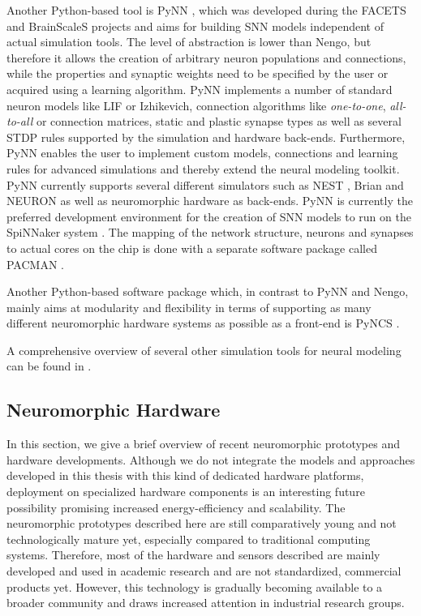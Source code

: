 Another Python-based tool is \ac{PyNN} \parencite{Davies2010}, which was developed during the \ac{FACETS}  and \ac{BrainScaleS}  projects and aims for building \ac{SNN} models independent of actual simulation tools.
The level of abstraction is lower than \ac{Nengo}, but therefore it allows the creation of arbitrary neuron populations and connections, while the properties and synaptic weights need to be specified by the user or acquired using a learning algorithm.
\ac{PyNN} implements a number of standard neuron models like \ac{LIF} or Izhikevich, connection algorithms like \emph{one-to-one}, \emph{all-to-all} or connection matrices, static and plastic synapse types as well as several \ac{STDP} rules supported by the simulation and hardware back-ends.
Furthermore, \ac{PyNN} enables the user to implement custom models, connections and learning rules for advanced simulations and thereby extend the neural modeling toolkit.
\ac{PyNN} currently supports several different simulators such as \ac{NEST} \parencite{Gewaltig2007}, Brian \parencite{Goodman2009} and NEURON  \parencite{Carnevale2009} as well as neuromorphic hardware as back-ends.
\ac{PyNN} is currently the preferred development environment for the creation of \ac{SNN} models to run on the \ac{SpiNNaker} system \parencite{Furber2014}.
The mapping of the network structure, neurons and synapses to actual cores on the chip is done with a separate software package called \ac{PACMAN} \parencite{Galluppi2012}.

Another Python-based software package which, in contrast to \ac{PyNN} and \ac{Nengo}, mainly aims at modularity and flexibility in terms of supporting as many different neuromorphic hardware systems as possible as a front-end is \ac{PyNCS} \parencite{Stefanini2014}.

A comprehensive overview of several other simulation tools for neural modeling can be found in \textcite{Brette2007}.

\subsection{Neuromorphic Hardware}
\label{sec:neuromorphic_HW}

In this section, we give a brief overview of recent neuromorphic prototypes and hardware developments.
Although we do not integrate the models and approaches developed in this thesis with this kind of dedicated hardware platforms, deployment on specialized hardware components is an interesting future possibility promising increased energy-efficiency and scalability.
The neuromorphic prototypes described here are still comparatively young and not technologically mature yet, especially compared to traditional computing systems.
Therefore, most of the hardware and sensors described are mainly developed and used in academic research and are not standardized, commercial products yet.
However, this technology is gradually becoming available to a broader community and draws increased attention in industrial research groups.

